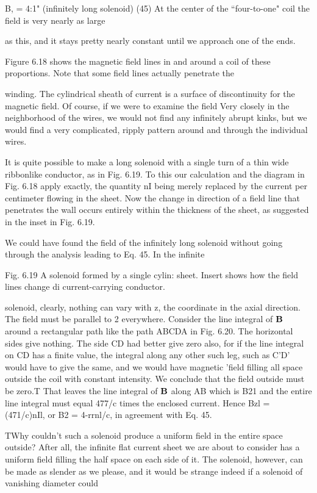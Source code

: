 B, = 4:1" (infinitely long solenoid) (45)
At the center of the ``four-to-one" coil the field is very nearly as large

as this, and it stays pretty nearly constant until we approach one of
the ends.

Figure 6.18 shows the magnetic field lines in and around a coil of
these proportions. Note that some field lines actually penetrate the

winding. The cylindrical sheath of current is a surface of discontinuity
for the magnetic field. Of course, if we were to examine the
field Very closely in the neighborhood of the wires, we would not find
any infinitely abrupt kinks, but we would find a very complicated,
ripply pattern around and through the individual wires.

It is quite possible to make a long solenoid with a single turn of a
thin wide ribbonlike conductor, as in Fig. 6.19. To this our calculation
and the diagram in Fig. 6.18 apply exactly, the quantity nI being
merely replaced by the current per centimeter flowing in the sheet.
Now the change in direction of a field line that penetrates the wall
occurs entirely within the thickness of the sheet, as suggested in the
inset in Fig. 6.19.

We could have found the field of the infinitely long solenoid without
going through the analysis leading to Eq. 45. In the infinite

 

Fig. 6.19 A solenoid formed by a single cylin:
sheet. Insert shows how the field lines change di
current-carrying conductor.

solenoid, clearly, nothing can vary with z, the coordinate in the axial
direction. The field must be parallel to 2 everywhere. Consider the
line integral of $\mathbf{B}$ around a rectangular path like the path ABCDA in
Fig. 6.20. The horizontal sides give nothing. The side CD had better
give zero also, for if the line integral on CD has a finite value, the
integral along any other such leg, such as C'D' would have to give
the same, and we would have magnetic 'field filling all space outside
the coil with constant intensity. We conclude that the field outside
must be zero.T That leaves the line integral of $\mathbf{B}$ along AB which is
B21 and the entire line integral must equal 477/c times the enclosed
current. Hence Bzl = (471/c)nIl, or B2 = 4-rrnl/c, in agreement
with Eq. 45.

TWhy couldn't such a solenoid produce a uniform field in the entire space outside?
After all, the infinite flat current sheet we are about to consider has a uniform field
filling the half space on each side of it. The solenoid, however, can be made as slender
as we please, and it would be strange indeed if a solenoid of vanishing diameter could

